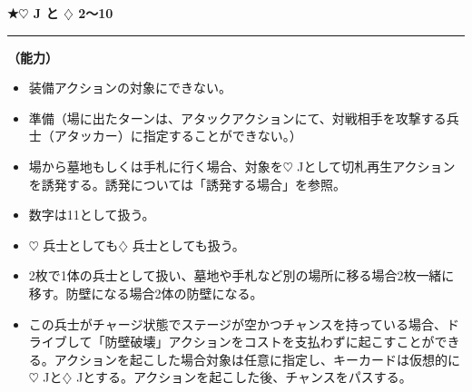 \documentclass[twocolumn,a5paper,papersize,10pt]{jarticle}
\begin{document}
\vspace{2mm}
\begin{tcolorbox}[title={\small\bf【Character】チャリオット}{\scriptsize （兵士）}]

  {\scriptsize\bf ★{\normalsize $\heartsuit$} J と {\normalsize $\diamondsuit$} 2〜10}

\vspace{1mm} %
\hrule height 0.1mm depth 0mm width 62mm %
\vspace{1mm} %

{\bf（能力）}


\vspace{-1zh}%
\begin{itemize}
\setlength{\leftskip}{-0.3cm}
\setlength{\parskip}{0pt} %

\item 装備アクションの対象にできない。

\item 準備（場に出たターンは、アタックアクションにて、対戦相手を攻撃する兵士（アタッカー）に指定することができない。）

\item 場から墓地もしくは手札に行く場合、対象を{\normalsize $\heartsuit$} Jとして切札再生アクションを誘発する。誘発については「誘発する場合」を参照。

\item 数字は11として扱う。

\item {\normalsize $\heartsuit$} 兵士としても{\normalsize $\diamondsuit$} 兵士としても扱う。

\item 2枚で1体の兵士として扱い、墓地や手札など別の場所に移る場合2枚一緒に移す。防壁になる場合2体の防壁になる。

\item この兵士がチャージ状態でステージが空かつチャンスを持っている場合、ドライブして「防壁破壊」アクションをコストを支払わずに起こすことができる。アクションを起こした場合対象は任意に指定し、キーカードは仮想的に{\normalsize $\heartsuit$} Jと{\normalsize $\diamondsuit$} Jとする。アクションを起こした後、チャンスをパスする。
\vspace{-1zh}%
\end{itemize}

\vspace{1mm} %
\end{tcolorbox}
\end{document}
